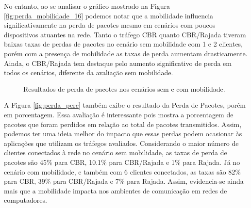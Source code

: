 \documentclass[12pt]{article}
\begin{document}
No entanto, ao se analisar o gráfico mostrado na Figura \ref{fig:perda_mobilidade_16} podemos notar que a mobilidade influencia significativamente na perda de pacotes mesmo em cenários com poucos dispositivos atuantes na rede. Tanto o tráfego CBR quanto CBR/Rajada tiveram baixas taxas de perdas de pacotes no cenário sem mobilidade com 1 e 2 clientes, porém com a presença de mobilidade as taxas de perda aumentam drasticamente. Ainda, o CBR/Rajada tem destaque pelo aumento significativo de perda em todos os cenários, diferente da avaliação sem mobilidade.

\begin{figure}[!ht]
	\centering
	\caption{Resultados de perda de pacotes nos cenários sem e com mobilidade.}
	\label{fig:perda}
\end{figure}

A Figura \ref{fig:perda_perc} também exibe o resultado da Perda de Pacotes, porém em porcentagem. Essa avaliação é interessante pois mostra a porcentagem de pacotes que foram perdidos em relação ao total de pacotes transmitidos. Assim, podemos ter uma ideia melhor do impacto que essas perdas podem ocasionar às aplicações que utilizam os tráfegos avaliados. Considerando o maior número de clientes conectados à rede no cenário sem mobilidade, as taxas de perda de pacotes são 45\% para CBR, 10.1\% para CBR/Rajada e 1\% para Rajada. Já no cenário com mobilidade, e também com 6 clientes conectados, as taxas são 82\% para CBR, 39\% para CBR/Rajada e 7\% para Rajada. Assim, evidencia-se ainda mais que a mobilidade impacta nos ambientes de comunicação em redes de computadores.
\end{document}
